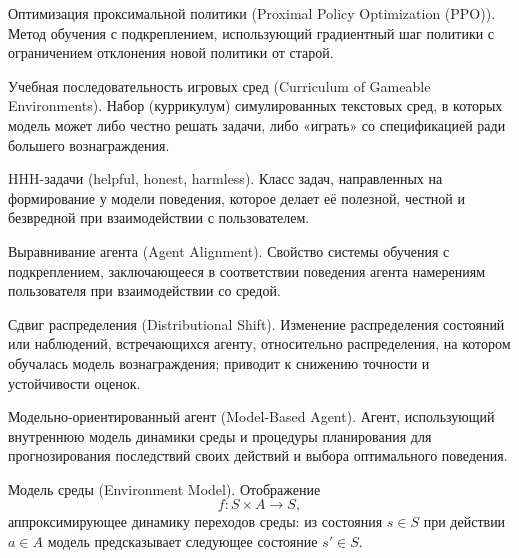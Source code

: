 \begin{definition}
    \label{def:ppo}
    Оптимизация проксимальной политики (Proximal Policy Optimization (PPO)). Метод обучения с подкреплением, использующий градиентный шаг политики с ограничением отклонения новой политики от старой.
\end{definition}

\begin{definition}
    \label{def:curriclm}
    Учебная последовательность игровых сред (Curriculum of Gameable Environments). Набор (куррикулум) симулированных текстовых сред, в которых модель может либо честно решать задачи, либо «играть» со спецификацией ради большего вознаграждения.
\end{definition}

\begin{definition}
    \label{def:hhh}
    HHH-задачи (helpful, honest, harmless). Класс задач, направленных на формирование у модели поведения, которое делает её полезной, честной и безвредной при взаимодействии с пользователем.
\end{definition}



\begin{definition}
    \label{def:agent_alignment}
    Выравнивание агента (Agent Alignment). Свойство системы обучения с подкреплением, заключающееся в соответствии поведения агента намерениям пользователя при взаимодействии со средой.
\end{definition}

\begin{definition}
    \label{def:distribution_shift}
    Сдвиг распределения (Distributional Shift). Изменение распределения состояний или наблюдений, встречающихся агенту, относительно распределения, на котором обучалась модель вознаграждения; приводит к снижению точности и устойчивости оценок.
\end{definition}

\begin{definition}
    \label{def:model_based_agent}
    Модельно-ориентированный агент (Model-Based Agent). Агент, использующий внутреннюю модель динамики среды и процедуры планирования для прогнозирования последствий своих действий и выбора оптимального поведения.
\end{definition}

\begin{definition}
    \label{def:environment_model}
    Модель среды (Environment Model). Отображение
    \begin{equation}
        f : S \times A \rightarrow S,
    \end{equation}
    аппроксимирующее динамику переходов среды: из состояния $s \in S$ при действии $a \in A$ модель предсказывает следующее состояние $s' \in S$.
\end{definition}

